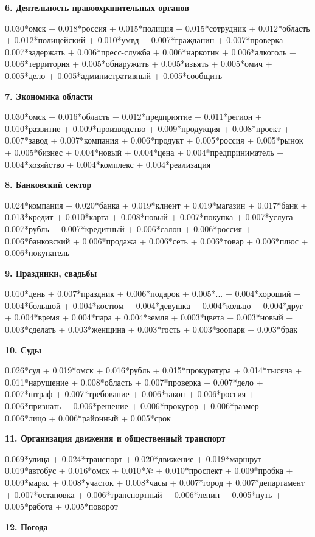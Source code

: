 \textbf{6. Деятельность правоохранительных органов}

0.030*омск + 0.018*россия + 0.015*полиция + 0.015*сотрудник + 0.012*область + 0.012*полицейский + 0.010*умвд + 0.007*гражданин + 0.007*проверка + 0.007*задержать + 0.006*пресс-служба + 0.006*наркотик + 0.006*алкоголь + 0.006*территория + 0.005*обнаружить + 0.005*изъять + 0.005*омич + 0.005*дело + 0.005*административный + 0.005*сообщить

\textbf{7. Экономика области}

0.030*омск + 0.016*область + 0.012*предприятие + 0.011*регион + 0.010*развитие + 0.009*производство + 0.009*продукция + 0.008*проект + 0.007*завод + 0.007*компания + 0.006*продукт + 0.005*россия + 0.005*рынок + 0.005*бизнес + 0.004*новый + 0.004*цена + 0.004*предприниматель + 0.004*хозяйство + 0.004*комплекс + 0.004*реализация

\textbf{8. Банковский сектор}

0.024*компания + 0.020*банка + 0.019*клиент + 0.019*магазин + 0.017*банк + 0.013*кредит + 0.010*карта + 0.008*новый + 0.007*покупка + 0.007*услуга + 0.007*рубль + 0.007*кредитный + 0.006*салон + 0.006*россия + 0.006*банковский + 0.006*продажа + 0.006*сеть + 0.006*товар + 0.006*плюс + 0.006*покупатель

\textbf{9. Праздники, свадьбы}

0.010*день + 0.007*праздник + 0.006*подарок + 0.005*... + 0.004*хороший + 0.004*большой + 0.004*костюм + 0.004*девушка + 0.004*кольцо + 0.004*друг + 0.004*время + 0.004*пара + 0.004*земля + 0.003*цвета + 0.003*новый + 0.003*сделать + 0.003*женщина + 0.003*гость + 0.003*зоопарк + 0.003*брак

\textbf{10. Суды}

0.026*суд + 0.019*омск + 0.016*рубль + 0.015*прокуратура + 0.014*тысяча + 0.011*нарушение + 0.008*область + 0.007*проверка + 0.007*дело + 0.007*штраф + 0.007*требование + 0.006*закон + 0.006*россия + 0.006*признать + 0.006*решение + 0.006*прокурор + 0.006*размер + 0.006*лицо + 0.006*районный + 0.005*срок

\textbf{11. Организация движения и общественный транспорт}

0.069*улица + 0.024*транспорт + 0.020*движение + 0.019*маршрут + 0.019*автобус + 0.016*омск + 0.010*№ + 0.010*проспект + 0.009*пробка + 0.009*маркс + 0.008*участок + 0.008*часы + 0.007*город + 0.007*департамент + 0.007*остановка + 0.006*транспортный + 0.006*ленин + 0.005*путь + 0.005*работа + 0.005*поворот

\textbf{12. Погода}

